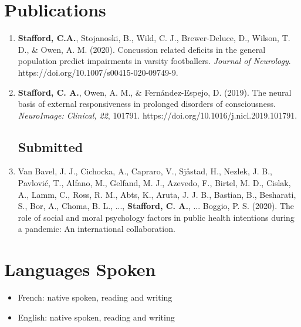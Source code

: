 \documentclass[letterpaper]{twentysecondcv} %
\begin{document}

\section{Publications}

\begin{enumerate} %
	\item \textbf{Stafford, C.A.}, Stojanoski, B., Wild, C. J., Brewer-Deluce, D., Wilson, T. D., \& Owen, A. M. (2020). Concussion related deficits in the general population predict impairments in varsity footballers. \emph{Journal of Neurology}.\newline
	https://doi.org/10.1007/s00415-020-09749-9.
	\item \textbf{Stafford, C. A.}, Owen, A. M., \& Fern\'andez-Espejo, D. (2019). The neural basis of external responsiveness in prolonged disorders of consciousness. \emph{NeuroImage: Clinical, 22}, 101791. https://doi.org/10.1016/j.nicl.2019.101791.
\subsection{Submitted}
	\item Van Bavel, J. J., Cichocka, A., Capraro, V., Sjåstad, H., Nezlek, J. B., Pavlović, T., Alfano, M., Gelfand, M. J., Azevedo, F., Birtel, M. D., Cislak, A., Lamm, C., Ross, R. M., Abts, K., Aruta, J. J. B., Bastian, B., Besharati, S., Bor, A., Choma, B. L., ..., \textbf{Stafford, C. A.}, ... Boggio, P. S. (2020). The role of social and moral psychology factors in public health intentions during a pandemic: An international collaboration.
\end{enumerate}


\section{Languages Spoken}

\begin{itemize}
	\item French: native spoken, reading and writing
	\item English: native spoken, reading and writing
\end{itemize}
\end{document}
